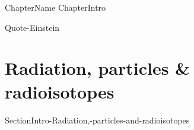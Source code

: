 \documentclass[main.tex]{subfiles}
\newcommand\chapterlabel{Ch-nuclear}\setcounter{figurenewcounter}{0}\setcounter{tablenewcounter}{0}\setcounter{formulanewcounter}{0}\chapterpicture{../{\chapterlabel}/figure1}\chapterpicturelabel{PxFuel}
\begin{document}
{ChapterName}
{ChapterIntro}
%
%
%

  {Quote-Einstein}





\section{Radiation, particles \& radioisotopes}
{SectionIntro-Radiation,-particles-and-radioisotopes}
\end{document}
